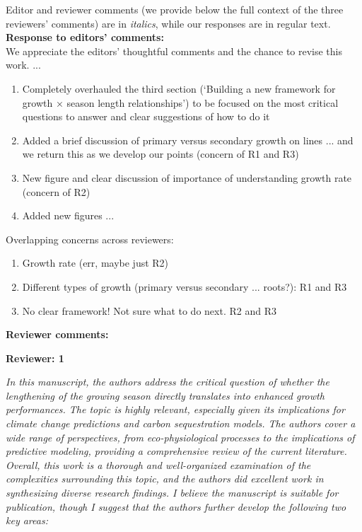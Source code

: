 \documentclass[11pt]{article}
\begin{document}
\setlength{\parindent}{0cm}
\setlength{\parskip}{7pt}


\renewcommand{\refname}{\CHead{}}

Editor and reviewer comments (we provide below the full context of the three reviewers' comments) are in \emph{italics}, while our responses are in regular text. \\ 

{\bf Response to editors' comments:} \\  %

We appreciate the editors' thoughtful comments and the chance to revise this work. ...

\begin{enumerate}
\item Completely overhauled the third section (`Building a new framework for growth × season length relationships') to be focused on the most critical questions to answer and clear suggestions of how to do it
\item Added a brief discussion of primary versus secondary growth on lines ...  and we return this as we develop our points  (concern of R1 and R3) 
\item New figure and clear discussion of importance of understanding growth rate (concern of R2) 
\item Added new figures ... 
\end{enumerate}

Overlapping concerns across reviewers:
\begin{enumerate}
\item Growth rate (err, maybe just R2) 
\item Different types of growth (primary versus secondary ... roots?):  R1 and R3
\item No clear framework! Not sure what to do next. R2 and R3 
\end{enumerate}

{\bf Reviewer comments:} 

{\bf Reviewer: 1}


\emph{In this manuscript, the authors address the critical question of whether the lengthening of the growing season directly translates into enhanced growth performances. The topic is highly relevant, especially given its implications for climate change predictions and carbon sequestration models. The authors cover a wide range of perspectives, from eco-physiological processes to the implications of predictive modeling, providing a comprehensive review of the current literature. Overall, this work is a thorough and well-organized examination of the complexities surrounding this topic, and the authors did excellent work in synthesizing diverse research findings. I believe the manuscript is suitable for publication, though I suggest that the authors further develop the following two key areas:}
\end{document}
